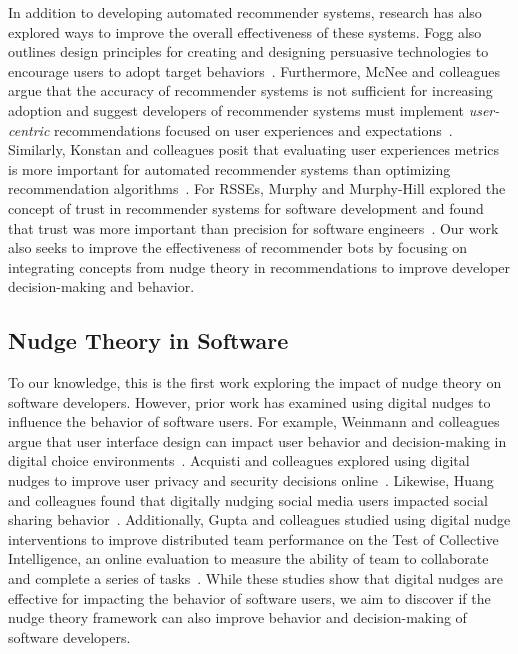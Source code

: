 In addition to developing automated recommender systems, research has also explored ways to improve the overall effectiveness of these systems. Fogg also outlines design principles for creating and designing persuasive technologies to encourage users to adopt target behaviors~\cite{Fogg2009Persuasive}. Furthermore, McNee and colleagues argue that the accuracy of recommender systems is not sufficient for increasing adoption and suggest developers of recommender systems must implement \textit{user-centric} recommendations focused on user experiences and expectations~\cite{McNee2006Accuracy}. Similarly, Konstan and colleagues posit that evaluating user experiences metrics is more important for automated recommender systems than optimizing recommendation algorithms~\cite{konstan2012recommender}. For RSSEs, Murphy and Murphy-Hill explored the concept of trust in recommender systems for software development and found that trust was more important than precision for software engineers~\cite{murphy2010trust}. Our work also seeks to improve the effectiveness of recommender bots by focusing on integrating concepts from nudge theory in recommendations to improve developer decision-making and behavior.

\subsection{Nudge Theory in Software}

To our knowledge, this is the first work exploring the impact of nudge theory on software developers. However, prior work has examined using digital nudges to influence the behavior of software users. For example, Weinmann and colleagues argue that user interface design can impact user behavior and decision-making in digital choice environments~\cite{weinmann2016digitalnudging}. Acquisti and colleagues explored using digital nudges to improve user privacy and security decisions online~\cite{acquisti2017nudges}. Likewise, Huang and colleagues found that digitally nudging social media users impacted social sharing behavior~\cite{huang2018digital}. Additionally, Gupta and colleagues studied using digital nudge interventions to improve distributed team performance on the Test of Collective Intelligence, an online evaluation to measure the ability of team to collaborate and complete a series of tasks~\cite{gupta2019digitally}. While these studies show that digital nudges are effective for impacting the behavior of software users, we aim to discover if the nudge theory framework can also improve behavior and decision-making of software developers.